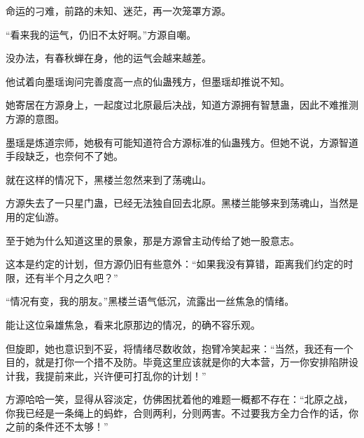 \begin{this_body}
命运的刁难，前路的未知、迷茫，再一次笼罩方源。

“看来我的运气，仍旧不太好啊。”方源自嘲。

没办法，有春秋蝉在身，他的运气会越来越差。

他试着向墨瑶询问完善度高一点的仙蛊残方，但墨瑶却推说不知。

她寄居在方源身上，一起度过北原最后决战，知道方源拥有智慧蛊，因此不难推测方源的意图。

墨瑶是炼道宗师，她极有可能知道符合方源标准的仙蛊残方。但她不说，方源智道手段缺乏，也奈何不了她。

就在这样的情况下，黑楼兰忽然来到了荡魂山。

方源失去了一只星门蛊，已经无法独自回去北原。黑楼兰能够来到荡魂山，当然是用的定仙游。

至于她为什么知道这里的景象，那是方源曾主动传给了她一股意志。

这本是约定的计划，但方源仍旧有些意外：“如果我没有算错，距离我们约定的时限，还有半个月之久吧？”

“情况有变，我的朋友。”黑楼兰语气低沉，流露出一丝焦急的情绪。

能让这位枭雄焦急，看来北原那边的情况，的确不容乐观。

但旋即，她也意识到不妥，将情绪尽数收敛，抱臂冷笑起来：“当然，我还有一个目的，就是打你一个措不及防。毕竟这里应该就是你的大本营，万一你安排陷阱设计我，我提前来此，兴许便可打乱你的计划！”

方源哈哈一笑，显得从容淡定，仿佛困扰着他的难题一概都不存在：“北原之战，你我已经是一条绳上的蚂蚱，合则两利，分则两害。不过要我方全力合作的话，你之前的条件还不太够！”

\end{this_body}

